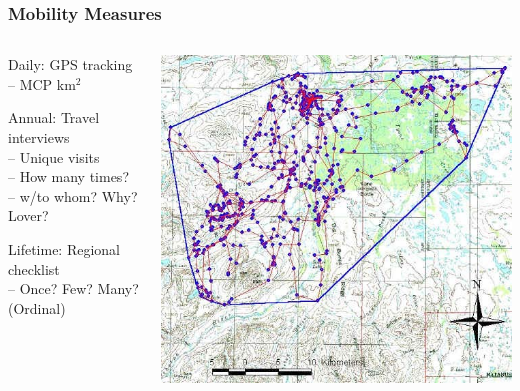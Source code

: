 \documentclass{beamer}
\begin{document}

\begin{frame}
\frametitle{Mobility Measures}

\begin{columns}
\begin{column}{.5\textwidth}
Daily: GPS tracking \\
-- MCP km$^{2}$ \\
\vspace{0.75cm}

Annual: Travel interviews \\
-- Unique visits \\
-- How many times? \\
-- w/to whom? Why? Lover? \\
\vspace{0.75cm}

Lifetime: Regional checklist \\
-- Once? Few? Many? (Ordinal)
\end{column}

\begin{column}{.5\textwidth}
\includegraphics[width= 1\textwidth]{MCP}
\end{column}

\end{columns}

\end{frame}
\end{document}
